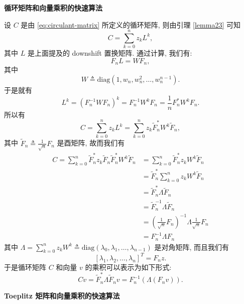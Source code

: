 \documentclass{ecnumaster}
\begin{document}
\bigskip\newpage
\noindent\textbf{循环矩阵和向量乘积的快速算法}

设 $C$ 是由 \eqref{eq:circulant-matrix} 所定义的循环矩阵,
则由引理 \ref{lemma23} 可知
\begin{equation}\nonumber
  C = \sum _{k=0}^n z_k L^k,
\end{equation}
其中 $L$ 是上面提及的 downshift 置换矩阵. 通过计算, 我们有:
\begin{equation}\nonumber
  F_n L = W F_n,
\end{equation}
其中
\begin{equation}\nonumber
  W \triangleq \mathrm{diag} (1, w_n, w_n^2, \dots, w_n^{n-1}).
\end{equation}
于是就有
\begin{equation}\nonumber
  L^k = (F_n^{-1}WF_n)^k = F_n^{-1}W^kF_n = \frac{1}{n} F_n^* W^k F_n.
\end{equation}
所以有
$$
  C = \sum _{k=0}^{n} z_k L^k = \sum _{k=0}^n z_k \tilde{F}_n^* W^k \tilde{F}_n,
$$
其中 $\tilde{F}_n \triangleq \frac{1}{\sqrt{n}} F_n$ 是酉矩阵,
故而我们有
\begin{equation}\label{eq2170}
  \begin{split}
  C = \sum _{k=0}^{n} \tilde{F}_n^* z_k \tilde{F}_n \tilde{F}_n^* W^k \tilde{F}_n
    &= \sum _{k=0}^{n} \tilde{F}_n^* z_k W^k \tilde{F}_n\\
    &= \tilde{F}_n^* \sum _{k=0}^{n} z_k W^k \tilde{F}_n\\
    &= \tilde{F}_n^* \Lambda \tilde{F}_n\\
    &= \tilde{F}_n^{-1} \Lambda \tilde{F}_n\\
    &= (\frac{1}{\sqrt{n}} F_n)^{-1} \Lambda \frac{1}{\sqrt{n}} F_n\\
    &= F_n^{-1} \Lambda F_n
  \end{split}
\end{equation}
其中 $\Lambda = \sum _{k=0}^{n} z_k W^k \triangleq \mathrm{diag}(\lambda _0, \lambda _1, \dots, \lambda _{n-1})$ 是对角矩阵, 而且我们有
\begin{equation}\nonumber
  [\lambda _1, \lambda _2, \dots, \lambda _n]^T = F_n z.
\end{equation}
于是循环矩阵 $C$ 和向量 $v$ 的乘积可以表示为如下形式:
\begin{equation}\label{eq217}
  Cv = \tilde{F}_n^* \Lambda \tilde{F}_n v = F_n^{-1}(\Lambda (F_n v)).
\end{equation}

\newpage
\noindent\textbf{Toeplitz 矩阵和向量乘积的快速算法}
\end{document}
